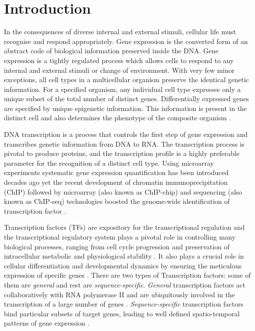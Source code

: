  \section{Introduction}
In the consequences of diverse internal and external stimuli, cellular life must recognise and respond appropriately. Gene expression is the converted form of an abstract code of biological information preserved inside the DNA. Gene expression is a tightly regulated process which allows cells to respond to any internal and external stimuli or change of environment. With very few minor exceptions, all cell types in a multicellular organism preserve the identical genetic information. For a specified organism, any individual cell type expresses only a unique subset of the total number of distinct genes. Differentially expressed genes are specified by unique epigenetic information. This information is present in the distinct cell and also determines the phenotype of the composite organism \cite{Keller:1994, Alberts:2002}. 

DNA transcription is a process that controls the first step of gene expression and transcribes genetic information from DNA to RNA. The transcription process is pivotal to produce proteins, and the transcription profile is a highly preferable parameter for the recognition of a distinct cell type. %
Using microarray experiments systematic gene expression quantification has been introduced decades ago \cite{Schena:1995} yet the recent development of chromatin immunoprecipitation (ChIP) followed by microarray (also known as ChIP-chip) and sequencing (also known as ChIP-seq) technologies boosted the genome-wide identification of transcription factor \cite{Ren:2000, Horak:2002}.

Transcription factors (TFs) are expository for the transcriptional regulation and the transcriptional regulatory system plays a pivotal role in controlling many biological processes, ranging from cell cycle progression and preservation of intracellular metabolic and physiological stability \cite{Simon:2001, Takahashi:2006}. It also plays a crucial role in cellular differentiation and developmental dynamics by ensuring the meticulous expression of specific genes \cite{Dynlacht:1997}. There are two types of Transcription factors: some of them are \emph{general} and rest are \emph{sequence-specific}. \emph{General} transcription factors act collaboratively with RNA polymerase II and are ubiquitously involved in the transcription of a large number of genes \cite{Lee:2000}. \emph{Sequence-specific} transcription factors bind particular subsets of target genes, leading to well defined spatio-temporal patterns of gene expression \cite{Kadonaga:2004}.

